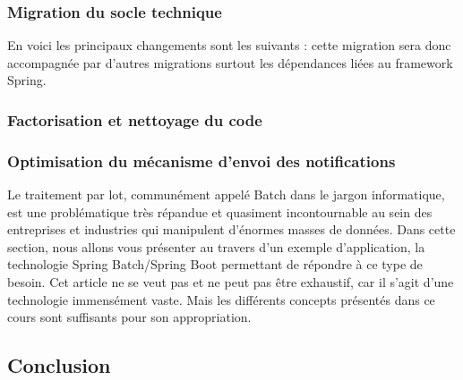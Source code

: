 \subsubsection{Migration du socle technique}
En voici les principaux changements sont les suivants :
cette migration sera donc accompagnée par d'autres migrations surtout les dépendances liées au framework Spring.​
\subsubsection{Factorisation et nettoyage du code}
\subsubsection{Optimisation du mécanisme d'envoi des notifications}
Le traitement par lot, communément appelé Batch dans le jargon informatique, est une problématique très répandue et quasiment incontournable au sein des entreprises et industries qui manipulent d'énormes masses de données. Dans cette section, nous allons vous présenter au travers d'un exemple d'application, la technologie Spring Batch/Spring Boot permettant de répondre à ce type de besoin. Cet article ne se veut pas et ne peut pas être exhaustif, car il s'agit d'une technologie immensément vaste. Mais les différents concepts présentés dans ce cours sont suffisants pour son appropriation.
\subsection{Conclusion}
